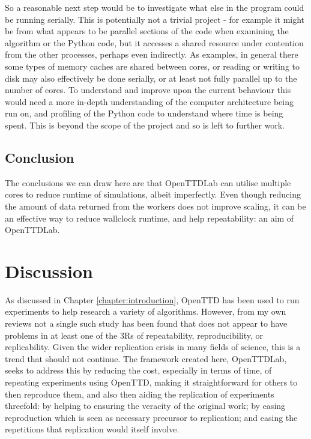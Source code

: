 \documentclass[logo,msc,dsti]{style/infthesis}    %
\begin{document}
{So a reasonable next step would be to investigate what else in the program could be running serially. This is potentially not a trivial project - for example it might be from what appears to be parallel sections of the code when examining the algorithm or the Python code, but it accesses a shared resource under contention from the other processes, perhaps even indirectly. As examples, in general there some types of memory caches are shared between cores, or reading or writing to disk  may also effectively be done serially, or at least not fully parallel up to the number of cores. To understand and improve upon the current behaviour this would need a more in-depth understanding of the computer architecture being run on, and profiling of the Python code to understand where time is being spent. This is beyond the scope of the project and so is left to further work.

\section{Conclusion}

The conclusions we can draw here are that OpenTTDLab can utilise multiple cores to reduce runtime of simulations, albeit imperfectly. Even though reducing the amount of data returned from the workers does not improve scaling, it can be an effective way to reduce wallclock runtime, and help repeatability: an aim of OpenTTDLab.

\chapter{Discussion}
\label{chapter:discussion}

As discussed in Chapter \ref{chapter:introduction}, OpenTTD has been used to run experiments to help research a variety of algorithms. However, from my own reviews not a single such study has been found that does not appear to have problems in at least one of the 3Rs of repeatability, reproducibility, or replicability. Given the wider replication crisis in many fields of science, this is a trend that should not continue. The framework created here, OpenTTDLab, seeks to address this by reducing the cost, especially in terms of time, of repeating experiments using OpenTTD, making it straightforward for others to then reproduce them, and also then aiding the replication of experiments threefold: by helping to ensuring the veracity of the original work; by easing reproduction which is seen as necessary precursor to replication; and easing the repetitions that replication would itself involve.

}
\end{document}
